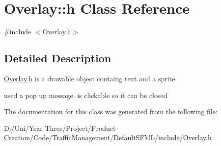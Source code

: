 \hypertarget{class_overlay_1_1h}{}\section{Overlay\+:\+:h Class Reference}
\label{class_overlay_1_1h}


{\ttfamily \#include $<$Overlay.\+h$>$}



\subsection{Detailed Description}
\hyperlink{class_overlay_1_1h}{Overlay.\+h} is a drawable object containg text and a sprite

used a pop up message, is clickable so it can be closed 

The documentation for this class was generated from the following file\+:\begin{DoxyCompactItemize}
\item 
D\+:/\+Uni/\+Year Three/\+Project/\+Product Creation/\+Code/\+Traffic\+Management/\+Default\+S\+F\+M\+L/include/Overlay.\+h\end{DoxyCompactItemize}
